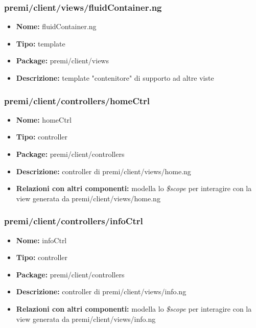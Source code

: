   
\subsubsection{premi/client/views/fluidContainer.ng}
\begin{itemize}
  \item[] \textbf{Nome:} fluidContainer.ng
  \item[] \textbf{Tipo:} template
  \item[] \textbf{Package:} premi/client/views
  \item[] \textbf{Descrizione:} template "contenitore" di supporto ad altre viste
\end{itemize}


\subsubsection{premi/client/controllers/homeCtrl}
\begin{itemize}
  \item[] \textbf{Nome:} homeCtrl
  \item[] \textbf{Tipo:} controller
  \item[] \textbf{Package:} premi/client/controllers
  \item[] \textbf{Descrizione:} controller di premi/client/views/home.ng
   \item[] \textbf{Relazioni con altri componenti:} modella lo \textit{\$scope} per interagire con la view generata da premi/client/views/home.ng
\end{itemize}


\subsubsection{premi/client/controllers/infoCtrl}
\begin{itemize}
  \item[] \textbf{Nome:} infoCtrl
  \item[] \textbf{Tipo:} controller
  \item[] \textbf{Package:} premi/client/controllers
  \item[] \textbf{Descrizione:} controller di premi/client/views/info.ng
  \item[] \textbf{Relazioni con altri componenti:} modella lo \textit{\$scope} per interagire con la view generata da premi/client/views/info.ng 
\end{itemize}

